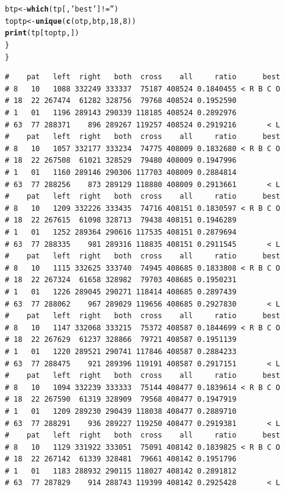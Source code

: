 \documentclass{article}\usepackage[]{graphicx}\usepackage[]{color}
\makeatletter
\newcommand{\hlnum}[1]{\textcolor[rgb]{0.686,0.059,0.569}{#1}}%
\newcommand{\hlstr}[1]{\textcolor[rgb]{0.192,0.494,0.8}{#1}}%
\newcommand{\hlopt}[1]{\textcolor[rgb]{0,0,0}{#1}}%
\newcommand{\hlstd}[1]{\textcolor[rgb]{0.345,0.345,0.345}{#1}}%
\newcommand{\hlkwb}[1]{\textcolor[rgb]{0.69,0.353,0.396}{#1}}%
\newcommand{\hlkwd}[1]{\textcolor[rgb]{0.737,0.353,0.396}{\textbf{#1}}}%
\newenvironment{kframe}{%
 \def\at@end@of@kframe{}%
 \ifinner\ifhmode%
  \def\at@end@of@kframe{\end{minipage}}%
  \begin{minipage}{\columnwidth}%
 \fi\fi%
 \def\FrameCommand##1{\hskip\@totalleftmargin \hskip-\fboxsep
 \colorbox{shadecolor}{##1}\hskip-\fboxsep
     \hskip-\linewidth \hskip-\@totalleftmargin \hskip\columnwidth}%
 \MakeFramed {\advance\hsize-\width
   \@totalleftmargin\z@ \linewidth\hsize
   \@setminipage}}%
 {\par\unskip\endMakeFramed%
 \at@end@of@kframe}
\newenvironment{knitrout}{}{} %
\makeatother
\begin{document}
\begin{knitrout}
\begin{kframe}
\begin{alltt}
    \hlstd{btp} \hlkwb{<-} \hlkwd{which}\hlstd{(tp[,}\hlstr{'best'}\hlstd{]} \hlopt{!=} \hlstr{''}\hlstd{)}
    \hlstd{toptp} \hlkwb{<-} \hlkwd{unique}\hlstd{(}\hlkwd{c}\hlstd{(otp,btp,}\hlnum{18}\hlstd{,}\hlnum{8}\hlstd{))}
    \hlkwd{print}\hlstd{(tp[toptp,])}
  \hlstd{\}}
\hlstd{\}}
\end{alltt}
\begin{verbatim}
#    pat   left  right   both  cross    all     ratio      best
# 8   10   1088 332249 333337  75187 408524 0.1840455 < R B C O
# 18  22 267474  61282 328756  79768 408524 0.1952590          
# 1   01   1196 289143 290339 118185 408524 0.2892976          
# 63  77 288371    896 289267 119257 408524 0.2919216       < L
#    pat   left  right   both  cross    all     ratio      best
# 8   10   1057 332177 333234  74775 408009 0.1832680 < R B C O
# 18  22 267508  61021 328529  79480 408009 0.1947996          
# 1   01   1160 289146 290306 117703 408009 0.2884814          
# 63  77 288256    873 289129 118880 408009 0.2913661       < L
#    pat   left  right   both  cross    all     ratio      best
# 8   10   1209 332226 333435  74716 408151 0.1830597 < R B C O
# 18  22 267615  61098 328713  79438 408151 0.1946289          
# 1   01   1252 289364 290616 117535 408151 0.2879694          
# 63  77 288335    981 289316 118835 408151 0.2911545       < L
#    pat   left  right   both  cross    all     ratio      best
# 8   10   1115 332625 333740  74945 408685 0.1833808 < R B C O
# 18  22 267324  61658 328982  79703 408685 0.1950231          
# 1   01   1226 289045 290271 118414 408685 0.2897439          
# 63  77 288062    967 289029 119656 408685 0.2927830       < L
#    pat   left  right   both  cross    all     ratio      best
# 8   10   1147 332068 333215  75372 408587 0.1844699 < R B C O
# 18  22 267629  61237 328866  79721 408587 0.1951139          
# 1   01   1220 289521 290741 117846 408587 0.2884233          
# 63  77 288475    921 289396 119191 408587 0.2917151       < L
#    pat   left  right   both  cross    all     ratio      best
# 8   10   1094 332239 333333  75144 408477 0.1839614 < R B C O
# 18  22 267590  61319 328909  79568 408477 0.1947919          
# 1   01   1209 289230 290439 118038 408477 0.2889710          
# 63  77 288291    936 289227 119250 408477 0.2919381       < L
#    pat   left  right   both  cross    all     ratio      best
# 8   10   1129 331922 333051  75091 408142 0.1839825 < R B C O
# 18  22 267142  61339 328481  79661 408142 0.1951796          
# 1   01   1183 288932 290115 118027 408142 0.2891812          
# 63  77 287829    914 288743 119399 408142 0.2925428       < L

\end{verbatim}
\end{kframe}
\end{knitrout}
\end{document}
